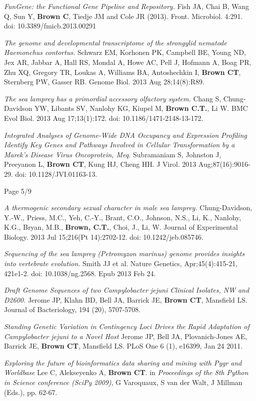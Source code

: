 \documentclass[margin,line]{resume}
\begin{document}
\begin{resume}
{\em FunGene: the Functional Gene Pipeline and Repository.} Fish JA, Chai B, Wang Q, Sun Y, {\bf Brown C}, Tiedje JM and Cole JR (2013).  Front. Microbiol. 4:291. doi: 10.3389/fmicb.2013.00291

{\em The genome and developmental transcriptome of the strongylid
  nematode Haemonchus contortus.}  Schwarz EM, Korhonen PK, Campbell
BE, Young ND, Jex AR, Jabbar A, Hall RS, Mondal A, Howe AC, Pell J,
Hofmann A, Boag PR, Zhu XQ, Gregory TR, Loukas A, Williams BA,
Antoshechkin I, {\bf Brown CT}, Sternberg PW, Gasser RB.  Genome
Biol. 2013 Aug 28;14(8):R89.

{\em The sea lamprey has a primordial accessory olfactory system.}
Chang S, Chung-Davidson YW, Libants SV, Nanlohy KG, Kiupel M, {\bf
  Brown C.T.}, Li W. BMC Evol Biol. 2013 Aug 17;13(1):172. doi:
10.1186/1471-2148-13-172.

{\em Integrated Analyses of Genome-Wide DNA Occupancy and Expression
  Profiling Identify Key Genes and Pathways Involved in Cellular
  Transformation by a Marek's Disease Virus Oncoprotein, Meq.}
Subramaniam S, Johnston J, Preeyanon L, {\bf Brown CT}, Kung HJ, Cheng
HH. J Virol. 2013 Aug;87(16):9016-29. doi: 10.1128/JVI.01163-13.

\vspace{1cm}
{\centerline {Page 5/9}}

\newpage

{\em A thermogenic secondary sexual character in male sea lamprey.}
Chung-Davidson, Y.-W., Priess, M.C., Yeh, C.-Y., Brant, C.O., Johnson,
N.S., Li, K., Nanlohy, K.G., Bryan, M.B., {\bf Brown, C.T.}, Choi, J.,
Li, W. Journal of Experimental Biology. 2013 Jul 15;216(Pt
14):2702-12. doi: 10.1242/jeb.085746.

{\em Sequencing of the sea lamprey (Petromyzon marinus) genome provides insights into vertebrate evolution.} Smith JJ et al. Nature Genetics, Apr;45(4):415-21, 421e1-2. doi: 10.1038/ng.2568. Epub 2013 Feb 24.

{\em Draft Genome Sequences of two Campylobacter jejuni Clinical Isolates,
NW and D2600.} Jerome JP, Klahn BD, Bell JA, Barrick JE, {\bf Brown CT}, Mansfield LS. Journal of Bacteriology, 194 (20), 5707-5708.

{\em Standing Genetic Variation in Contingency Loci Drives the Rapid
  Adaptation of Campylobacter jejuni to a Novel Host} Jerome JP, Bell
JA, Plovanich-Jones AE, Barrick JE, {\bf Brown CT}, Mansfield LS.  PLoS One 6
(1), e16399, Jan 24 2011.

{\em Exploring the future of bioinformatics data sharing and mining
  with Pygr and Worldbase} Lee C, Alekseyenko A, {\bf Brown CT}.  in {\em
  Proceedings of the 8th Python in Science conference (SciPy 2009)}, G
Varoquaux, S van der Walt, J Millman (Eds.), pp. 62-67.


\end{resume}
\end{document}
